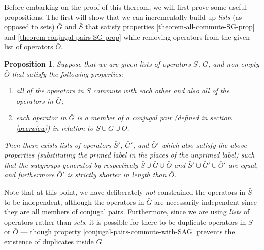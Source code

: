 \documentclass[twocolumn,showpacs,preprintnumbers,amsmath,amssymb,nofootinbib,pra,floatfix]{revtex4}
\newtheorem{proposition}{Proposition}
\newenvironment{remark}[1][Remark]{\begin{trivlist}
\item[\hskip \labelsep {\bfseries #1}]}{\end{trivlist}}
\begin{document}
\begin{remark}
Before embarking on the proof of this thereom, we will first prove some useful propositions.  The first will show that we can incrementally build up \emph{lists} (as opposed to sets) $\bar G$ and $\bar S$ that satisfy properties \ref{theorem-all-commute-SG-prop} and \ref{theorem-conjugal-pairs-SG-prop} while removing operators from the given list of operators $\bar O$.
\end{remark}

\begin{proposition} \label{proposition-SG} Suppose that we are given lists of operators $\bar S$, $\bar G$, and non-empty $\bar O$ that satisfy the following properties:
\begin{enumerate}
\item all of the operators in $\bar S$ commute with each other and also all of the operators in $\bar G$; \label{stabs-commute-with-G}
\item each operator in $\bar G$ is a member of a \emph{conjugal pair} (defined in section \ref{overview}) in relation to $\bar S \cup \bar G \cup \bar O$. \label{conjugal-pairs-commute-with-SAG}
\end{enumerate}
Then there exists lists of operators $\bar S'$, $\bar G'$, and $\bar O'$ which also satisfy the above properties (substituting the primed label in the places of the unprimed label) such that the subgroups generated by respectively $\bar S\cup \bar G\cup \bar O$ and $\bar S'\cup \bar G'\cup \bar O'$ are equal, and furthermore $\bar O'$ is strictly shorter in length than $\bar O$.
\end{proposition}

\begin{remark}
Note that at this point, we have deliberately \emph{not} constrained the operators in $\bar S$ to be independent, although the operators in $\bar G$ are necessarily independent since they are all members of conjugal pairs.  Furthermore, since we are using \emph{lists} of operators rather than \emph{sets}, it is possible for there to be duplicate operators in $\bar S$ or $\bar O$ --- though property \ref{conjugal-pairs-commute-with-SAG} prevents the existence of duplicates inside $\bar G$.
\end{remark}
\end{document}
